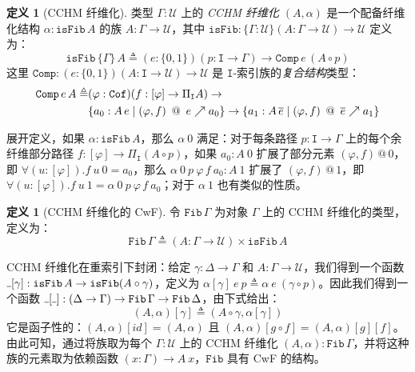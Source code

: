 \documentclass{ctexart}
\theoremstyle{plain}
\theoremstyle{definition}
\newtheorem{definition}[theorem]{定义}
\theoremstyle{definition}
\theoremstyle{definition}
\theoremstyle{definition}
\newcommand\ttI{\mathtt{I}}
\newcommand{\Cof}{\mathtt{Cof}}
\newcommand{\ul}{{\rule[0ex]{0.4em}{0.4pt}}} %
\numberwithin{equation}{section}
\begin{document}
\begin{definition}[CCHM 纤维化]
类型 $\Gamma : \mathcal{U}$ 上的 \textit{CCHM 纤维化} $(A, \alpha)$ 是一个配备纤维化结构 $\alpha : \mathtt{isFib}\,A$ 的族 $A : \Gamma \to \mathcal{U}$，其中 $\mathtt{isFib} : \{\Gamma : \mathcal{U}\}(A : \Gamma \to \mathcal{U}) \to \mathcal{U}$ 定义为：
\begin{equation}
\mathtt{isFib}\,\{\Gamma\}\,A \triangleq (e : \{0, 1\})(p : \mathtt{I} \to \Gamma) \to \mathtt{Comp}\,e\,(A \circ p)
\end{equation}
这里 $\mathtt{Comp} : (e : \{0, 1\})(A : \mathtt{I} \to \mathcal{U}) \to \mathcal{U}$ 是 $\mathtt{I}$-索引族的\textit{复合结构}类型：
\begin{align}
\mathtt{Comp}\,e\,A \triangleq &(\varphi : \Cof)(f : [\varphi] \to \Pi_\mathtt{I} A) \to \\
&\{a_0 : A\,e \mid (\varphi, f) \ \,@\,\  e \nearrow a_0\} \to \{a_1 : A\,\overline{e} \mid (\varphi, f) \ \,@\,\  \overline{e} \nearrow a_1\}\notag
\end{align}
\end{definition}
展开定义，如果 $\alpha : \mathtt{isFib} \, A$，那么 $\alpha \ 0$ 满足：对于每条路径 $p : \ttI \to \Gamma$ 上的每个余纤维部分路径 $f : [\varphi] \to \Pi_{\ttI}(A \circ p)$，如果 $a_0 : A\ 0$ 扩展了部分元素 $(\varphi, f) \,@\, 0$，即 $\forall (u : [\varphi]) . f\ u\ 0 = a_0$，那么 $\alpha \ 0\ p\ \varphi\, f \ a_0 : A\ 1$ 扩展了 $(\varphi, f) \,@\, 1$，即 $\forall (u : [\varphi]) . f\ u\ 1 = \alpha \ 0 \ p \ \varphi \, f \ a_0$；对于 $\alpha \ 1$ 也有类似的性质。

\begin{definition}[CCHM 纤维化的 CwF]
  令 $\mathtt{Fib} \, \Gamma$ 为对象 $\Gamma$ 上的 CCHM 纤维化的类型，定义为：
\begin{equation}
  \mathtt{Fib} \, \Gamma \triangleq (A : \Gamma \to \mathcal{U}) \times \mathtt{isFib} \, A \end{equation}
\end{definition}
CCHM 纤维化在重索引下封闭：给定 $\gamma : \Delta \to \Gamma$ 和 $A : \Gamma \to \mathcal{U}$，我们得到一个函数 $\ul[\gamma] : \mathtt{isFib} \, A \to \mathtt{isFib}(A \circ \gamma)$，定义为 $\alpha[\gamma] \ e \ p \triangleq \alpha \ e \ (\gamma \circ p)$。因此我们得到一个函数 $\ul[\ul] : (\Delta \to \Gamma) \to \mathtt{Fib} \, \Gamma \to \mathtt{Fib} \, \Delta$，由下式给出：
\begin{equation}(A, \alpha)[\gamma] \triangleq (A \circ \gamma, \alpha[\gamma])\end{equation}
它是函子性的：$(A, \alpha)[id] = (A, \alpha)$ 且 $(A, \alpha)[g \circ f] = (A, \alpha)[g][f]$。由此可知，通过将族取为每个 $\Gamma : \mathcal{U}$ 上的 CCHM 纤维化 $(A, \alpha) : \mathtt{Fib} \, \Gamma$，并将这种族的元素取为依赖函数 $(x : \Gamma) \to A\ x$，$\mathtt{Fib}$ 具有 CwF 的结构。
\end{document}
